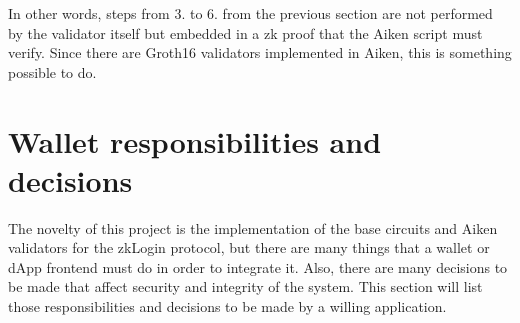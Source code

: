 \documentclass{article}
\begin{document}
In other words, steps from 3. to 6. from the previous section are not performed by the validator itself but embedded in a zk proof that the Aiken script must verify. Since there are Groth16 validators implemented in Aiken, this is something possible to do.

\section{Wallet responsibilities and decisions}
The novelty of this project is the implementation of the base circuits and Aiken validators for the zkLogin protocol, but there are many things that a wallet or dApp frontend must do in order to integrate it. Also, there are many decisions to be made that affect security and integrity of the system. This section will list those responsibilities and decisions to be made by a willing application.
\end{document}
